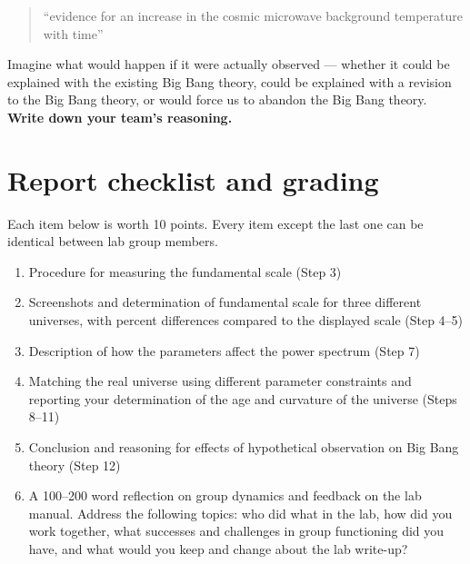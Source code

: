 \begin{quote}
	``evidence for an increase in the cosmic microwave background temperature with time''
\end{quote}

\begin{steps}
	\item Imagine what would happen if it were actually observed --- whether it could be explained with the existing Big Bang theory, could be explained with a revision to the Big Bang theory, or would force us to abandon the Big Bang theory. \textbf{Write down your team's reasoning.}

\end{steps}

\section{Report checklist and grading}

Each item below is worth 10 points. Every item except the last one can be identical between lab group members.

\begin{enumerate}
%	
	
	\item Procedure for measuring the fundamental scale (Step 3)
	
	\item Screenshots and determination of fundamental scale for three different universes, with percent differences compared to the displayed scale (Step 4--5)
	
	\item Description of how the parameters affect the power spectrum (Step 7)
	
	\item Matching the real universe using different parameter constraints and reporting your determination of the age and curvature of the universe (Steps 8--11)

	\item Conclusion and reasoning for effects of hypothetical observation on Big Bang theory (Step 12)
	
	\item A 100--200 word reflection on group dynamics and feedback on the lab manual. Address the following topics: who did what in the lab, how did you work together, what successes and challenges in group functioning did you have, and what would you keep and change about the lab write-up?
\end{enumerate}